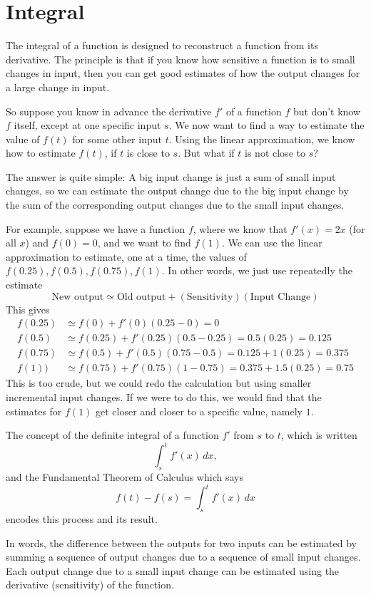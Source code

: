 \documentclass{math-deane}
\begin{document}
\section{Integral}

The integral of a function is designed to reconstruct a function from its derivative. The principle is that if you know how sensitive a function is to small changes in input, then you can get good estimates of how the output changes for a large change in input.

So suppose you know in advance the derivative $f'$ of a function $f$ but don't know $f$ itself, except at one specific input $s$. We now want to find a way to estimate the value of $f(t)$ for some other input $t$. Using the linear approximation, we know how to estimate $f(t)$, if $t$ is close to $s$. But what if $t$ is not close to $s$?

The answer is quite simple: A big input change is just a sum of small input changes, so we can estimate the output change due to  the big input change by the sum of the corresponding output changes due to the small input changes.

For example, suppose we have a function $f$, where we know that $f'(x) = 2x$ (for all $x$) and $f(0) = 0$, and we want to find $f(1)$. We can use the linear approximation to estimate, one at a time, the values of $f(0.25), f(0.5), f(0.75), f(1)$. In other words, we just use repeatedly the estimate
\[
\text{New output} \simeq \text{Old output} + (\text{Sensitivity})(\text{Input Change})
\]
This gives
\begin{align*}
f(0.25)	&\simeq f(0) + f'(0)(0.25-0) = 0\\
f(0.5) &\simeq f(0.25) + f'(0.25)(0.5-0.25) = 0.5(0.25) = 0.125\\
f(0.75) &\simeq f(0.5) + f'(0.5)(0.75-0.5) = 0.125 + 1(0.25) = 0.375\\
f(1)) &\simeq f(0.75) + f'(0.75)(1-0.75) = 0.375 + 1.5(0.25) = 0.75
\end{align*}
This is too crude, but we could redo the calculation but using smaller incremental input changes. If we were to do this, we would find that the estimates for $f(1)$ get closer and closer to a specific value, namely $1$.

The concept of the definite integral of a function $f'$ from $s$ to $t$, which is written
\[ \int_s^t f'(x)\,dx, \]
and the Fundamental Theorem of Calculus which says
\[ f(t) - f(s) = \int_s^t f'(x)\,dx \]
encodes this process and its result.

In words, the difference between the outputs for two inputs can be estimated by summing a sequence of output changes due to a sequence of small input changes. Each output change due to a small input change can be estimated using the derivative (sensitivity) of the function.
\end{document}
